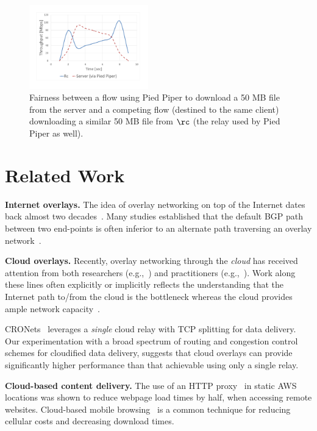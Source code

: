 \documentclass[newfonts=false,format=sigconf,anonymous,10pt,letterpaper]{acmart}
\newcommand{\T}[1]{\smallskip\noindent\textbf{#1}} %
\newcommand{\name}{Pied Piper\xspace}
\begin{document}
\begin{figure}[!t]
  \centering
    \includegraphics[width=0.46\textwidth,trim=20mm 25mm 25mm 20mm,clip]{figures/DirecVsPiper.pdf}
    \caption{Fairness between a flow using \name to download a 50 MB file from the server and a competing flow (destined to the same client) downloading a similar 50 MB file from $\rc$ (the relay used by \name as well). 
    }
    \label{fig:direct-vs-piper}
\end{figure}


\section{Related Work}\label{sec:related-work}

\T{Internet overlays.} The idea of overlay networking on top of the Internet dates back almost two decades~\cite{old-overlay-1, old-overlay-2, RON}. Many studies established that the default BGP path between two end-points is often inferior to an alternate path traversing an overlay network~\cite{old-overlay-1, old-overlay-2, RON, akamai-2, akamai-3, akamai-4}.

\T{Cloud overlays.} Recently, overlay networking through the \emph{cloud} has received attention from both researchers (e.g.,~\cite{CRONets}) and practitioners (e.g.,~\cite{teridion}). Work along these lines often explicitly or implicitly reflects the understanding that the Internet path to/from the cloud is the bottleneck whereas the cloud provides ample network capacity~\cite{le2016understanding,jeyakumar2012eyeq}.

CRONets~\cite{CRONets} leverages a \emph{single} cloud relay with TCP splitting for data delivery. Our experimentation with a broad spectrum of routing and congestion control schemes for cloudified data delivery, suggests that cloud overlays can provide significantly higher performance than that achievable using only a single relay.

\T{Cloud-based content delivery.} The use of an HTTP proxy~\cite{cgn2017} in static AWS locations was shown to reduce webpage load times by half, when accessing remote websites. Cloud-based mobile browsing~\cite{zhao2011reducing,wang2013accelerating} is a common technique for reducing cellular costs and decreasing download times.
\end{document}
